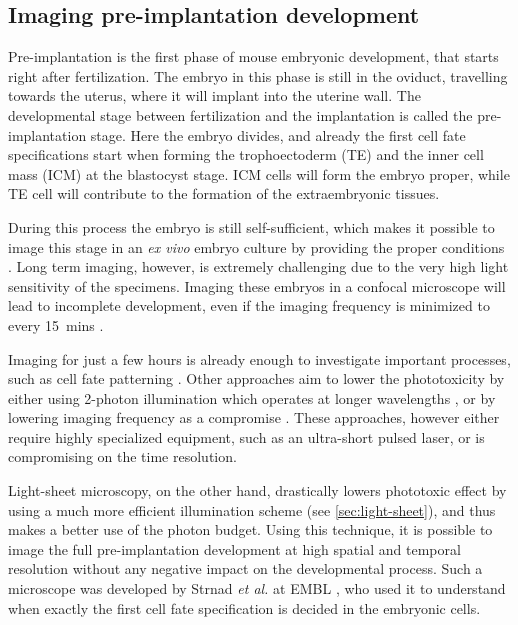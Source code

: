   \subsection{Imaging pre-implantation development}
  \label{ch:mouse-intro}
    Pre-implantation is the first phase of mouse embryonic development, that starts right after fertilization. The embryo in this phase is still in the oviduct, travelling towards the uterus, where it will implant into the uterine wall. The developmental stage between fertilization and the implantation is called the pre-implantation stage. Here the embryo divides, and already the first cell fate specifications start when forming the trophoectoderm (TE) and the inner cell mass (ICM) at the blastocyst stage. ICM cells will form the embryo proper, while TE cell will contribute to the formation of the extraembryonic tissues.
    
    During this process the embryo is still self-sufficient, which makes it possible to image this stage in an \textit{ex vivo} embryo culture by providing the proper conditions \cite{doherty_culture_2000}. Long term imaging, however, is extremely challenging due to the very high light sensitivity of the specimens. Imaging these embryos in a confocal microscope will lead to incomplete development, even if the imaging frequency is minimized to every \SI{15}{mins} \cite{strnad_inverted_2016}.

    Imaging for just a few hours is already enough to investigate important processes, such as cell fate patterning \cite{dietrich_stochastic_2007}. Other approaches aim to lower the phototoxicity by either using 2-photon illumination which operates at longer wavelengths \cite{denk_two-photon_1990,squirrell_long-term_1999,mcdole_lineage_2011}, or by lowering imaging frequency as a compromise \cite{yamagata_long-term_2009}. These approaches, however either require highly specialized equipment, such as an ultra-short pulsed laser, or is compromising on the time resolution.

    Light-sheet microscopy, on the other hand, drastically lowers phototoxic effect by using a much more efficient illumination scheme (see \autoref{sec:light-sheet}), and thus makes a better use of the photon budget. Using this technique, it is possible to image the full pre-implantation development at high spatial and temporal resolution without any negative impact on the developmental process. Such a microscope was developed by Strnad \textit{et al.} at EMBL \cite{strnad_inverted_2016}, who used it to understand when exactly the first cell fate specification is decided in the embryonic cells.

